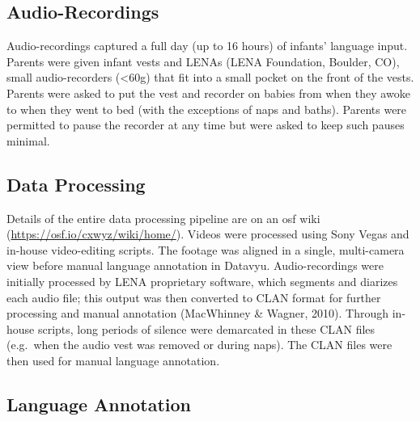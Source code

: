 \documentclass[man]{apa6}
\theoremstyle{definition}
\theoremstyle{definition}
\theoremstyle{definition}
\theoremstyle{remark}
\begin{document}
\subsection{Audio-Recordings}\label{audio-recordings}

Audio-recordings captured a full day (up to 16 hours) of infants'
language input. Parents were given infant vests and LENAs (LENA
Foundation, Boulder, CO), small audio-recorders (\textless{}60g) that
fit into a small pocket on the front of the vests. Parents were asked to
put the vest and recorder on babies from when they awoke to when they
went to bed (with the exceptions of naps and baths). Parents were
permitted to pause the recorder at any time but were asked to keep such
pauses minimal.

\subsection{Data Processing}\label{data-processing}

Details of the entire data processing pipeline are on an osf wiki
(\url{https://osf.io/cxwyz/wiki/home/}). Videos were processed using
Sony Vegas and in-house video-editing scripts. The footage was aligned
in a single, multi-camera view before manual language annotation in
Datavyu. Audio-recordings were initially processed by LENA proprietary
software, which segments and diarizes each audio file; this output was
then converted to CLAN format for further processing and manual
annotation (MacWhinney \& Wagner, 2010). Through in-house scripts, long
periods of silence were demarcated in these CLAN files (e.g.~when the
audio vest was removed or during naps). The CLAN files were then used
for manual language annotation.

\subsection{Language Annotation}\label{language-annotation}
\end{document}
